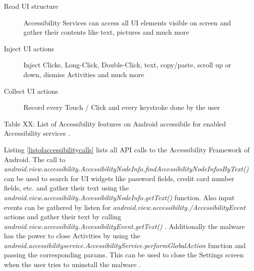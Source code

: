 \documentclass[10pt,titlepage]{article}
\begin{document}
\begin{description}
\item[Read UI structure] Accessibility Services can access all UI elements visible on screen and gather their contents like text, pictures and much more
\item[Inject UI actions] Inject Clicks, Long-Click, Double-Click, text, copy/paste, scroll up or down, dismiss Activities and much more
\item[Collect UI actions] Record every Touch / Click and every keystroke done by the user 
\end{description}
\begin{center}
Table XX: List of Accessibility features on Android accessibile for enabled Accessibility services \cite{ExploitingAccessibilityInOperatingSystems}.
\end{center}

Listing \ref{listofaccessibilitycalls} lists all API calls to the Accessibility Framework of Android. The call to \textit{android.view.accessibility.AccessibilityNodeInfo.findAccessibilityNodeInfosByText()} can be used to search for UI widgets like password fields, credit card number fields, etc. and gather their text using the \textit{android.view.accessibility.AccessibilityNodeInfo.getText()} function. Also input events can be gathered by listen for \textit{android.view.accessibility./AccessibilityEvent} actions and gather their text by calling 
\\ \textit{android.view.accessibility.AccessibilityEvent.getText()} \cite[/reference/android/view/accessibility/AccessibilityRecord\#getText()]{AndroidDev}. Additionally the malware has the power to close Activities by using the 
\\ \textit{android.accessibilityservice.AccessibilityService.performGlobalAction} function and passing the corresponding params. This can be used to close the Settings screen when the user tries to uninstall the malware \cite[/reference/android/accessibilityservice/AccessibilityService\#performGlobalAction(int)]{AndroidDev}.
\end{document}
